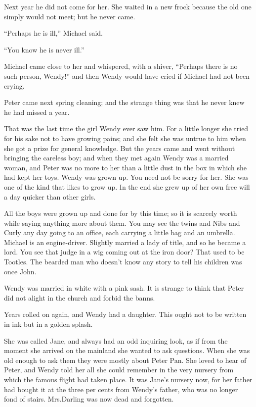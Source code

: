 Next year he did not come for her.
She waited in a new frock because the old one simply would not meet;
but he never came.

“Perhaps he is ill,” Michael said.

“You know he is never ill.”

Michael came close to her and whispered, with a shiver,
“Perhaps there is no such person, Wendy!\@”
and then Wendy would have cried if Michael had not been crying.

Peter came next spring cleaning;
and the strange thing was that he never knew he had missed a year.

That was the last time the girl Wendy ever saw him.
For a little longer she tried for his sake not to have growing pains;
and she felt she was untrue to him when she got a prize for general knowledge.
But the years came and went without bringing the careless boy;
and when they met again Wendy was a married woman,
and Peter was no more to her than a little dust in the box in which she had kept her toys.
Wendy was grown up.
You need not be sorry for her.
She was one of the kind that likes to grow up.
In the end she grew up of her own free will a day quicker than other girls.

All the boys were grown up and done for by this time;
so it is scarcely worth while saying anything more about them.
You may see the twins and Nibs and Curly any day going to an office,
each carrying a little bag and an umbrella.
Michael is an engine-driver.
Slightly married a lady of title, and so he became a lord.
You see that judge in a wig coming out at the iron door?
That used to be Tootles.
The bearded man who doesn’t know any story to tell his children was once John.

Wendy was married in white with a pink sash.
It is strange to think that Peter did not alight in the church and forbid the banns.

Years rolled on again, and Wendy had a daughter.
This ought not to be written in ink but in a golden splash.

She was called Jane, and always had an odd inquiring look,
as if from the moment she arrived on the mainland she wanted to ask questions.
When she was old enough to ask them they were mostly about Peter Pan.
She loved to hear of Peter,
and Wendy told her all she could remember in the very nursery from which the famous flight had taken place.
It was Jane’s nursery now,
for her father had bought it at the three per cents from Wendy’s father,
who was no longer fond of stairs.
Mrs.\@ Darling was now dead and forgotten.

